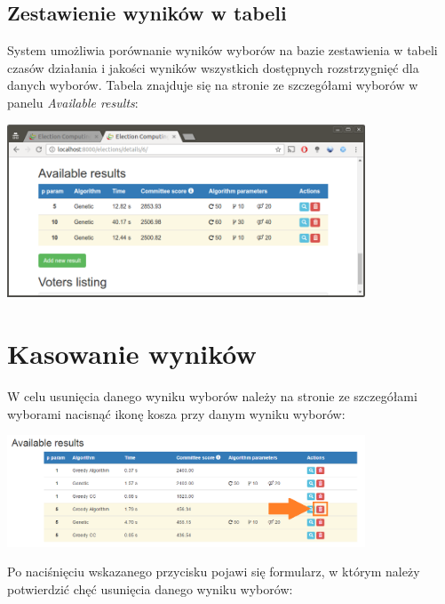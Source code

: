 \documentclass[pdflatex,11pt]{../aghdoc_version2}
\begin{document}
\newpage
\subsection{Zestawienie wyników w tabeli}
\label{subsec:tabelazwynikami}

System umożliwia porównanie wyników wyborów na bazie zestawienia w tabeli czasów działania i jakości wyników wszystkich dostępnych rozstrzygnięć dla danych wyborów. Tabela znajduje się na stronie ze szczegółami wyborów w panelu \textit{Available results}: \\

\begin{center}
\includegraphics[width=0.8\textwidth]{pics/results-on-table.png}
\end{center}

\section{Kasowanie wyników}
\label{sec:kasowaniewynikow}
W celu usunięcia danego wyniku wyborów należy na stronie ze szczegółami wyborami nacisnąć ikonę kosza przy danym wyniku wyborów: \\

\begin{center}
\includegraphics[width=0.8\textwidth]{pics/delete_result_button.png}
\end{center}

\newpage
Po naciśnięciu wskazanego przycisku pojawi się formularz, w którym należy potwierdzić chęć usunięcia danego wyniku wyborów: \\
\end{document}
